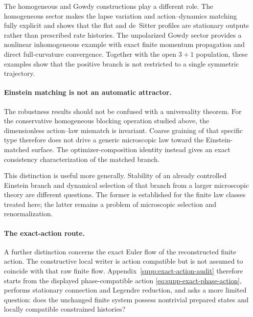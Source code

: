 \documentclass[11pt]{article}
\numberwithin{equation}{section}
\theoremstyle{definition}
\theoremstyle{remark}
\begin{document}
The homogeneous and Gowdy constructions play a different role.  The
homogeneous sector makes the lapse variation and action--dynamics matching
fully explicit and shows that the flat and de~Sitter profiles are stationary
outputs rather than prescribed rate histories.  The unpolarized Gowdy sector
provides a nonlinear inhomogeneous example with exact finite momentum
propagation and direct full-curvature convergence.  Together with the open
$3+1$ population, these examples show that the positive branch is not
restricted to a single symmetric trajectory.

\paragraph{Einstein matching is not an automatic attractor.}

The robustness results should not be confused with a universality theorem.
For the conservative homogeneous blocking operation studied above, the
dimensionless action--law mismatch is invariant.  Coarse graining of that
specific type therefore does not drive a generic microscopic law toward the
Einstein-matched surface.  The optimizer-composition identity instead gives
an exact consistency characterization of the matched branch.

This distinction is useful more generally.  Stability of an already
controlled Einstein branch and dynamical selection of that branch from a
larger microscopic theory are different questions.  The former is
established for the finite law classes treated here; the latter remains a
problem of microscopic selection and renormalization.

\paragraph{The exact-action route.}

A further distinction concerns the exact Euler flow of the reconstructed
finite action.  The constructive local writer is action compatible but is not
assumed to coincide with that raw finite flow.  Appendix~\ref{supp:exact-action-audit}
therefore starts from the displayed phase-compatible action
\eqref{eq:supp-exact-phase-action}, performs stationary connection and
Legendre reduction, and asks a more limited question: does the unchanged
finite system possess nontrivial prepared states and locally compatible
constrained histories?
\end{document}
